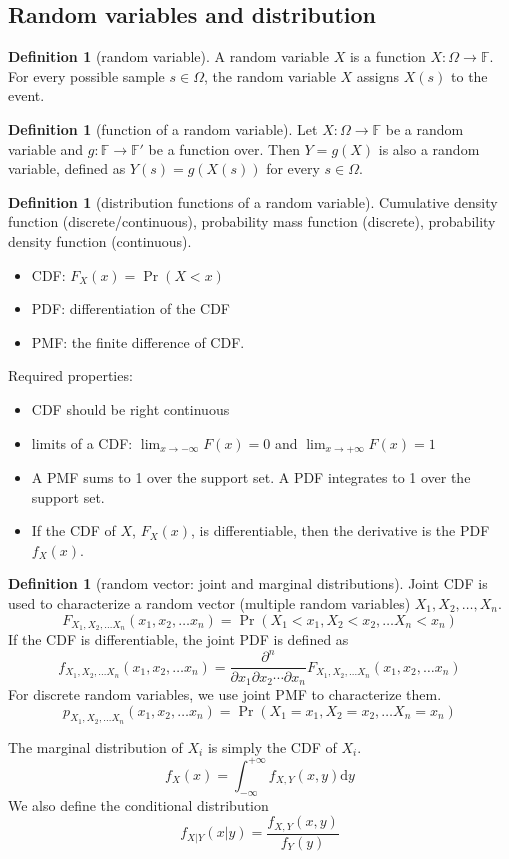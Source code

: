 \documentclass{article}
\theoremstyle{definition}
\newtheorem{definition}[theorem]{Definition}
\theoremstyle{remark}
\newcommand{\intoo}{\int_{-\infty}^{+\infty}}
\newcommand{\dy}{\mathrm{d}y}
\begin{document}
\subsection{Random variables and distribution}

\begin{definition}[random variable]
	A random variable \(X\) is a function \(X:\Omega\to\mathbb{F}\).
	For every possible sample \(s\in\Omega\), the random variable \(X\) assigns \(X(s)\) to the event.
\end{definition}
\begin{definition}[function of a random variable]
	Let \(X: \Omega\to\mathbb{F}\) be a random variable and \(g: \mathbb{F}\to\mathbb{F}'\) be a function over.
	Then \(Y=g(X)\) is also a random variable, defined as \( Y(s) = g(X(s)) \) for every \(s\in\Omega\).
\end{definition}


\begin{definition}[distribution functions of a random variable]
	Cumulative density function (discrete/continuous),
	probability mass function (discrete),
	probability density function (continuous).\\
	\begin{itemize}
		\item CDF: \(F_X(x) = \Pr(X<x)\)
		\item PDF: differentiation of the CDF
		\item PMF: the finite difference of CDF.
	\end{itemize}
	Required properties:
	\begin{itemize}
		\item CDF should be right continuous
		\item limits of a CDF: \(\lim_{x\to -\infty} F(x)=0\) and \(\lim_{x\to +\infty} F(x)=1\)
		\item A PMF sums to 1 over the support set.
		      A PDF integrates to 1 over the support set.
		\item If the CDF of \(X\), \(F_X(x)\), is differentiable, then the derivative is the PDF \(f_X(x)\).
	\end{itemize}
\end{definition}

\begin{definition}[random vector: joint and marginal distributions]
	Joint CDF is used to characterize a random vector (multiple random variables) \(X_1,X_2,\ldots, X_n\).
	\[
		F_{X_1,X_2,\ldots X_n}(x_1,x_2,\ldots x_n) = \Pr(X_1<x_1,X_2<x_2,\ldots X_n<x_n)
	\]
	If the CDF is differentiable, the joint PDF is defined as
	\[
		f_{X_1,X_2,\ldots X_n}(x_1,x_2,\ldots x_n) = \frac{\partial^n}{\partial x_1 \partial x_2 \cdots \partial x_n} F_{X_1,X_2,\ldots X_n}(x_1,x_2,\ldots x_n)
	\]
	For discrete random variables, we use joint PMF to characterize them.
	\[
		p_{X_1,X_2,\ldots X_n}(x_1,x_2,\ldots x_n) = \Pr(X_1=x_1,X_2=x_2,\ldots X_n=x_n)
	\]

	The marginal distribution of \(X_i\) is simply the CDF of \(X_i\).
	\[
		f_{X}(x) = \intoo f_{X,Y}(x,y) \dy
	\]
	We also define the conditional distribution
	\[
		f_{X|Y}(x|y) = \frac{f_{X,Y}(x,y)}{f_{Y}(y)}
	\]
\end{definition}
\end{document}
